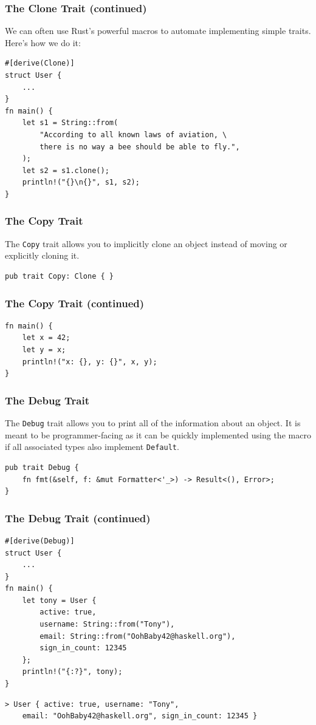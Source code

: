\documentclass{slides}
\begin{document}
\begin{frame}[fragile]
\frametitle{The Clone Trait (continued)}
We can often use Rust's powerful macros to automate implementing simple traits. Here's how we do it:
\begin{verbatim}
#[derive(Clone)]
struct User {
    ...
}
fn main() {
    let s1 = String::from(
        "According to all known laws of aviation, \
        there is no way a bee should be able to fly.",
    );
    let s2 = s1.clone();
    println!("{}\n{}", s1, s2);
}
\end{verbatim}
\end{frame}

\begin{frame}[fragile]
\frametitle{The Copy Trait}
The \texttt{Copy} trait allows you to implicitly clone an object instead of moving or explicitly cloning it.
\begin{verbatim}
pub trait Copy: Clone { }
\end{verbatim}
\end{frame}

\begin{frame}[fragile]
\frametitle{The Copy Trait (continued)}
\begin{verbatim}
fn main() {
    let x = 42;
    let y = x;
    println!("x: {}, y: {}", x, y);
}
\end{verbatim}
\end{frame}

\begin{frame}[fragile]
\frametitle{The Debug Trait}
The \texttt{Debug} trait allows you to print all of the information about an object. It is meant to be programmer-facing as it can be quickly implemented using the macro if all associated types also implement \texttt{Default}.
\begin{verbatim}
pub trait Debug {
    fn fmt(&self, f: &mut Formatter<'_>) -> Result<(), Error>;
}
\end{verbatim}
\end{frame}

\begin{frame}[fragile]
\frametitle{The Debug Trait (continued)}
\begin{verbatim}
#[derive(Debug)]
struct User {
    ...
}
fn main() {
    let tony = User {
        active: true,
        username: String::from("Tony"),
        email: String::from("OohBaby42@haskell.org"),
        sign_in_count: 12345
    };
    println!("{:?}", tony);
}
\end{verbatim}
\begin{verbatim}
> User { active: true, username: "Tony", 
    email: "OohBaby42@haskell.org", sign_in_count: 12345 }
\end{verbatim}
\end{frame}
\end{document}
